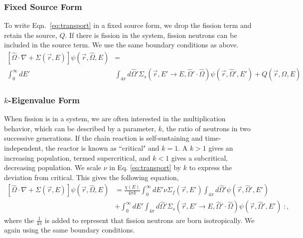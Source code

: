 \subsubsection{Fixed Source Form}
To write Eqn.~\eqref{eq:transport} in a fixed source form, we drop the fission term and retain the source, $Q$. If there is fission in the system, fission neutrons can be included in the source term. We use the same boundary conditions as above. 
%
\begin{equation}
\begin{split}
 [\hat{\Omega} \cdot \nabla + \Sigma(\vec{r}, E)]\psi(\vec{r}, \hat{\Omega}, E) &= \\ \int_0^\infty dE' &\int_{4\pi} d\hat{\Omega}' \Sigma_s(\vec{r}, E' \rightarrow E, \hat{\Omega}' \cdot \hat{\Omega})\psi(\vec{r}, \hat{\Omega}', E')  + Q(\vec{r}, \hat{\Omega}, E)
\end{split}
 \label{eq:transport_fixed_source}
\end{equation}

\subsubsection{$k$-Eigenvalue Form}
When fission is in a system, we are often interested in the multiplication behavior, which can be described by a parameter, $k$, the ratio of neutrons in two successive generations. If the chain reaction is self-sustaining and time-independent, the reactor is known as ``critical" and $k=1$. A $k>1$ gives an increasing population, termed supercritical, and $k<1$ gives a subcritical, decreasing population. We scale $\nu$ in Eq. \eqref{eq:transport} by $k$ to express the deviation from critical. This gives the following equation,
%
\begin{equation}
    \label{eq:transport_eigenvalue}
    \begin{split}
        [\hat{\Omega} \cdot \nabla + \Sigma(\vec{r}, E)]\psi(\vec{r}, \hat{\Omega}, E) &= \frac{\chi(E)}{4\pi k} \int_0^\infty dE' \nu \Sigma_{f}(\vec{r}, E') \int_{4\pi} d\hat{\Omega}'\psi(\vec{r}, \hat{\Omega}', E') \\ &+ \int_0^\infty dE' \int_{4\pi} d\hat{\Omega}' \Sigma_s(\vec{r}, E' \rightarrow E, \hat{\Omega}' \cdot \hat{\Omega})\psi(\vec{r}, \hat{\Omega}', E') \ :,
    \end{split}
\end{equation}
where the $\frac{1}{4\pi}$ is added to represent that fission neutrons are born isotropically. We again using the same boundary conditions. 

